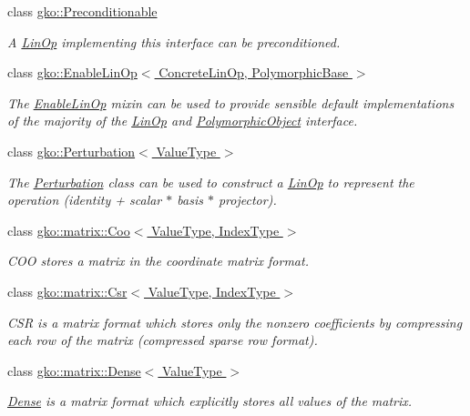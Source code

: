 \begin{DoxyCompactItemize}
class \hyperlink{classgko_1_1Preconditionable}{gko\+::\+Preconditionable}
\begin{DoxyCompactList}\small\item\em A \hyperlink{classgko_1_1LinOp}{Lin\+Op} implementing this interface can be preconditioned. \end{DoxyCompactList}\item 
class \hyperlink{classgko_1_1EnableLinOp}{gko\+::\+Enable\+Lin\+Op$<$ Concrete\+Lin\+Op, Polymorphic\+Base $>$}
\begin{DoxyCompactList}\small\item\em The \hyperlink{classgko_1_1EnableLinOp}{Enable\+Lin\+Op} mixin can be used to provide sensible default implementations of the majority of the \hyperlink{classgko_1_1LinOp}{Lin\+Op} and \hyperlink{classgko_1_1PolymorphicObject}{Polymorphic\+Object} interface. \end{DoxyCompactList}\item 
class \hyperlink{classgko_1_1Perturbation}{gko\+::\+Perturbation$<$ Value\+Type $>$}
\begin{DoxyCompactList}\small\item\em The \hyperlink{classgko_1_1Perturbation}{Perturbation} class can be used to construct a \hyperlink{classgko_1_1LinOp}{Lin\+Op} to represent the operation {\ttfamily (identity + scalar $\ast$ basis $\ast$ projector)}. \end{DoxyCompactList}\item 
class \hyperlink{classgko_1_1matrix_1_1Coo}{gko\+::matrix\+::\+Coo$<$ Value\+Type, Index\+Type $>$}
\begin{DoxyCompactList}\small\item\em C\+OO stores a matrix in the coordinate matrix format. \end{DoxyCompactList}\item 
class \hyperlink{classgko_1_1matrix_1_1Csr}{gko\+::matrix\+::\+Csr$<$ Value\+Type, Index\+Type $>$}
\begin{DoxyCompactList}\small\item\em C\+SR is a matrix format which stores only the nonzero coefficients by compressing each row of the matrix (compressed sparse row format). \end{DoxyCompactList}\item 
class \hyperlink{classgko_1_1matrix_1_1Dense}{gko\+::matrix\+::\+Dense$<$ Value\+Type $>$}
\begin{DoxyCompactList}\small\item\em \hyperlink{classgko_1_1matrix_1_1Dense}{Dense} is a matrix format which explicitly stores all values of the matrix. \end{DoxyCompactList}\item 

\end{DoxyCompactItemize}
